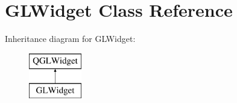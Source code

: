 \hypertarget{class_g_l_widget}{}\section{G\+L\+Widget Class Reference}
\label{class_g_l_widget}
Inheritance diagram for G\+L\+Widget\+:\begin{figure}[H]
\begin{center}
\leavevmode
\includegraphics[height=2.000000cm]{class_g_l_widget}
\end{center}
\end{figure}
